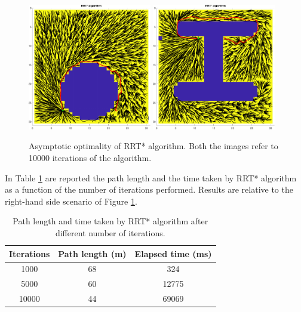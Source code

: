 \begin{figure}[H]
    \centering
    \includegraphics[width=0.48\textwidth]{./img/MATLAB/optimality/circle_rrt_star_path_optimality_10000.pdf}
    \includegraphics[width=0.48\textwidth]{./img/MATLAB/optimality/04_rrt_star_path_optimality_10000.pdf}
    \caption{Asymptotic optimality of RRT* algorithm. Both the images refer to 10000 iterations of the algorithm.}
    \label{fig:04_rrt_star_path_optimality_asymptotic}
\end{figure}

In Table \ref{tab:04_rrt_star_path_optimality_asymptotic} are reported the path length and the time taken by RRT* algorithm as a function of the number of iterations performed.
Results are relative to the right-hand side scenario of Figure \ref{fig:04_rrt_star_path_optimality_asymptotic}.

\begin{table}[H]
    \centering
    \begin{tabular}{|c|c|c|}
        \hline
        \textbf{Iterations} & \textbf{Path length (m)} & \textbf{Elapsed time (ms)} \\
        \hline
        1000                & 68                       & 324                        \\
        5000                & 60                       & 12775                      \\
        10000               & 44                       & 69069                      \\
        \hline
    \end{tabular}
    \caption{Path length and time taken by RRT* algorithm after different number of iterations.}
    \label{tab:04_rrt_star_path_optimality_asymptotic}
\end{table}

